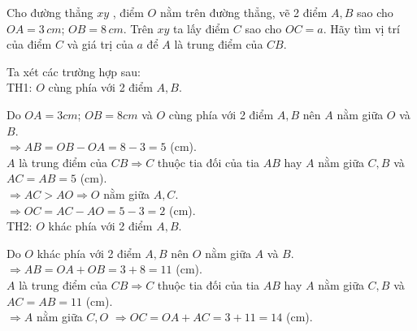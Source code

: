 \begin{bt}
	Cho đường thẳng  $xy$ , điểm  $O$  nằm trên đường thẳng, vẽ 2 điểm  $A,B$ sao cho  $OA=3\,cm$; $OB=8\,cm$.  Trên  $xy$  ta lấy điểm  $C$  sao cho  $OC=a$.  Hãy tìm vị trí của điểm  $C$ và giá trị của  $a$  để  $A$  là trung điểm của  $CB$.
	\begin{loigiaichuong29}
		Ta xét các trường hợp sau:\\
		TH1: $O$ cùng phía với 2 điểm $A,B.$ 
		\begin{center}
		\end{center}
		Do $OA=3cm$; $OB=8cm$  và $O$ cùng phía với 2 điểm $A,B$  nên $A$  nằm giữa $O$ và $B$.\\
		$\Rightarrow AB=OB-OA=8-3=5$ (cm).\\ 
		$A$  là trung điểm của $CB \Rightarrow C$ thuộc tia đối của tia $AB$  hay $A$  nằm giữa $C,B$ và $AC=AB=5$ (cm).\\
		$\Rightarrow AC>AO \Rightarrow O$  nằm giữa $A,C$.\\
		$\Rightarrow OC=AC-AO=5-3=2$ (cm).\\ 
		TH2: $O$  khác phía với 2 điểm $A,B$.\\ 
		\begin{center}
		\end{center}
		Do $O$  khác phía với 2 điểm $A,B$  nên $O$  nằm giữa $A$  và $B$.\\
		$\Rightarrow AB=OA+OB=3+8=11$ (cm).\\ 
		$A$  là trung điểm của $CB \Rightarrow C$ thuộc tia đối của tia $AB$  hay $A$  nằm giữa $C,B$ và $AC=AB=11$ (cm).\\ 
		$\Rightarrow A$ nằm giữa $C,O$ $\Rightarrow OC=OA+AC=3+11=14$ (cm). 
	\end{loigiaichuong29}
\end{bt}






